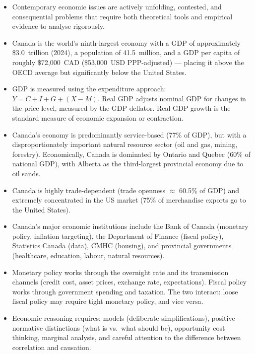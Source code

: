 \begin{itemize}
  \item Contemporary economic issues are actively unfolding, contested, and
        consequential problems that require both theoretical tools and
        empirical evidence to analyse rigorously.

  \item Canada is the world's ninth-largest economy with a GDP of
        approximately \$3.0~trillion (2024), a population of 41.5~million,
        and a GDP per capita of roughly \$72,000~CAD (\$53,000~USD
        PPP-adjusted) --- placing it above the OECD average but
        significantly below the United States.

  \item GDP is measured using the expenditure approach: $Y = C + I + G +
        (X-M)$. Real GDP adjusts nominal GDP for changes in the price level,
        measured by the GDP deflator. Real GDP growth is the standard measure
        of economic expansion or contraction.

  \item Canada's economy is predominantly service-based (77\% of GDP), but
        with a disproportionately important natural resource sector (oil and
        gas, mining, forestry). Economically, Canada is dominated by Ontario
        and Quebec (60\% of national GDP), with Alberta as the third-largest
        provincial economy due to oil sands.

  \item Canada is highly trade-dependent (trade openness $\approx$ 60.5\%
        of GDP) and extremely concentrated in the US market (75\% of
        merchandise exports go to the United States).

  \item Canada's major economic institutions include the Bank of Canada
        (monetary policy, inflation targeting), the Department of Finance
        (fiscal policy), Statistics Canada (data), CMHC (housing), and
        provincial governments (healthcare, education, labour, natural
        resources).

  \item Monetary policy works through the overnight rate and its transmission
        channels (credit cost, asset prices, exchange rate, expectations).
        Fiscal policy works through government spending and taxation.
        The two interact: loose fiscal policy may require tight monetary
        policy, and vice versa.

  \item Economic reasoning requires: models (deliberate simplifications),
        positive--normative distinctions (what is vs.\ what should be),
        opportunity cost thinking, marginal analysis, and careful attention
        to the difference between correlation and causation.


\end{itemize}
